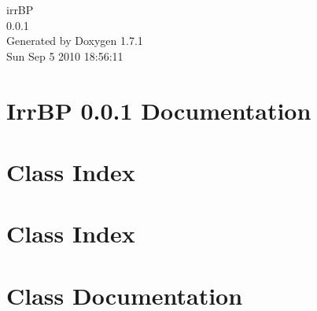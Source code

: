 \documentclass[a4paper]{book}
\begin{document}
\hypersetup{pageanchor=false}
\begin{titlepage}
\vspace*{7cm}
\begin{center}
{\Large irrBP \\[1ex]\large 0.0.1 }\\
\vspace*{1cm}
{\large Generated by Doxygen 1.7.1}\\
\vspace*{0.5cm}
{\small Sun Sep 5 2010 18:56:11}\\
\end{center}
\end{titlepage}
\clearemptydoublepage
{}
\tableofcontents
\clearemptydoublepage
{}
\hypersetup{pageanchor=true}
\chapter{IrrBP 0.0.1 Documentation}
\label{index}\hypertarget{index}{}
\chapter{Class Index}

\chapter{Class Index}

\chapter{Class Documentation}






















\printindex
\end{document}
